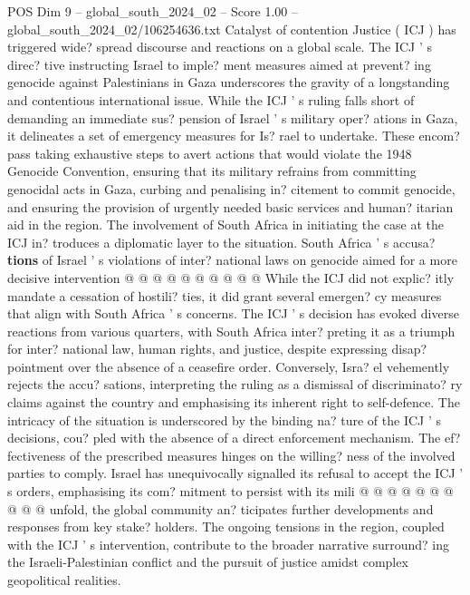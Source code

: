 \begin{textsample}{POS Dim 9 – global\_south\_2024\_02 – Score 1.00 – global\_south\_2024\_02/106254636.txt}  \label{ex:f9_pos_094}
Catalyst of contention Justice ( ICJ ) has triggered wide? spread discourse and reactions on a global scale.
The ICJ ' s direc? tive instructing Israel to imple? ment measures aimed at prevent? ing genocide against Palestinians in Gaza underscores the gravity of a longstanding and contentious international issue.
While the ICJ ' s ruling falls short of demanding an immediate sus? pension of Israel ' s military oper? ations in Gaza, it delineates a set of emergency measures for Is? rael to undertake.
These encom? pass taking exhaustive steps to avert actions that would violate the 1948 Genocide Convention, ensuring that its military refrains from committing genocidal acts in Gaza, curbing and penalising in? citement to commit genocide, and ensuring the provision of urgently needed basic services and human? itarian aid in the region.
The involvement of South Africa in initiating the case at the ICJ in? troduces a diplomatic layer to the situation.
South Africa ' s accusa? \textbf{tions} of Israel ' s violations of inter? national laws on genocide aimed for a more decisive intervention @ @ @ @ @ @ @ @ @ @ While the ICJ did not explic? itly mandate a cessation of hostili? ties, it did grant several emergen? cy measures that align with South Africa ' s concerns.
The ICJ ' s decision has evoked diverse reactions from various quarters, with South Africa inter? preting it as a triumph for inter? national law, human rights, and justice, despite expressing disap? pointment over the absence of a ceasefire order.
Conversely, Isra? el vehemently rejects the accu? sations, interpreting the ruling as a dismissal of discriminato? ry claims against the country and emphasising its inherent right to self-defence.
The intricacy of the situation is underscored by the binding na? ture of the ICJ ' s decisions, cou? pled with the absence of a direct enforcement mechanism.
The ef? fectiveness of the prescribed measures hinges on the willing? ness of the involved parties to comply.
Israel has unequivocally signalled its refusal to accept the ICJ ' s orders, emphasising its com? mitment to persist with its mili @ @ @ @ @ @ @ @ @ @ unfold, the global community an? ticipates further developments and responses from key stake? holders.
The ongoing tensions in the region, coupled with the ICJ ' s intervention, contribute to the broader narrative surround? ing the Israeli-Palestinian conflict and the pursuit of justice amidst complex geopolitical realities.

\end{textsample}
